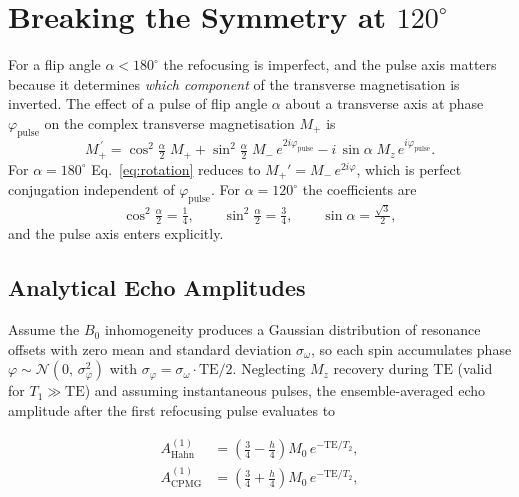\documentclass[11pt, a4paper]{article}
\begin{document}
\section{Breaking the Symmetry at $120^\circ$}

For a flip angle $\alpha < 180^\circ$ the refocusing is imperfect, and the pulse axis
matters because it determines \emph{which component} of the transverse magnetisation is
inverted.  The effect of a pulse of flip angle $\alpha$ about a transverse axis at phase
$\varphi_{\mathrm{pulse}}$ on the complex transverse magnetisation $M_+$ is
\begin{equation}
  M_+^{\,\prime}
  = \cos^2\!\tfrac{\alpha}{2}\;M_+
  + \sin^2\!\tfrac{\alpha}{2}\;M_-\,e^{2i\varphi_{\mathrm{pulse}}}
  - i\,\sin\alpha\;M_z\,e^{i\varphi_{\mathrm{pulse}}}.
  \label{eq:rotation}
\end{equation}
For $\alpha = 180^\circ$ Eq.~\eqref{eq:rotation} reduces to $M_+' = M_-\,e^{2i\varphi}$,
which is perfect conjugation independent of $\varphi_{\mathrm{pulse}}$.  For
$\alpha = 120^\circ$ the coefficients are
\begin{equation}
  \cos^2\!\tfrac{\alpha}{2} = \tfrac{1}{4}, \qquad
  \sin^2\!\tfrac{\alpha}{2} = \tfrac{3}{4}, \qquad
  \sin\alpha = \tfrac{\sqrt{3}}{2},
\end{equation}
and the pulse axis enters explicitly.

\subsection{Analytical Echo Amplitudes}

Assume the $B_0$ inhomogeneity produces a Gaussian distribution of resonance offsets
with zero mean and standard deviation $\sigma_\omega$, so each spin accumulates phase
$\varphi \sim \mathcal{N}(0,\,\sigma_\varphi^2)$ with
$\sigma_\varphi = \sigma_\omega\cdot\mathrm{TE}/2$.  Neglecting $M_z$ recovery during
$\mathrm{TE}$ (valid for $T_1 \gg \mathrm{TE}$) and assuming instantaneous pulses, the
ensemble-averaged echo amplitude after the first refocusing pulse evaluates to

\begin{align}
  A_{\mathrm{Hahn}}^{(1)}  &= \left(\frac{3}{4} - \frac{h}{4}\right) M_0\,
                               e^{-\mathrm{TE}/T_2}, \label{eq:hahn}\\[4pt]
  A_{\mathrm{CPMG}}^{(1)}  &= \left(\frac{3}{4} + \frac{h}{4}\right) M_0\,
                               e^{-\mathrm{TE}/T_2}, \label{eq:cpmg}
\end{align}
\end{document}
